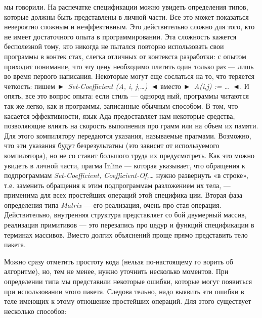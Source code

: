 \documentclass{../../template/mai_book}
\begin{document}
мы говорили. На распечатке спецификации можно увидеть определения
типов, которые должны быть представлены в личной части.
Все это может показаться невероятно сложным и неэффективным.
Это действительно сложно для того, кто не имеет достаточного опыта
в программировании. Эта сложность кажется бесполезной тому, кто
никогда не пытался повторно использовать свои программы в контек­
стах, слегка отличных от контекста разработки: с опытом приходит
понимание, что эту цену необходимо платить один только раз — лишь
во время первого написания. Некоторые могут еще сослаться на то,
что теряется четкость: пишем \textit{►~Set-Coefficient (A, i, j,\dots)~◄} вместо
\textit{►~A(i,j) := \dots~◄}. И опять, все это вопрос опыта: если стиль — однород­
ный, программы читаются так же легко, как и программы, записанные
обычным способом.
В том, что касается эффективности, язык Ада предоставляет нам
некоторые средства, позволяющие влиять на скорость выполнения про­
грамм или на объем их памяти. Для этого компилятору передаются
указания, называемые прагмами. Возможно, что эти указания будут
безрезультатны (это зависит от используемого компилятора), но не со­
ставит большого труда их предусмотреть. Как это можно увидеть в
личной части, прагма Inline — которая указывает, что обращения к
подпрограммам \textit{Set-Coefficient, Coefficient-Of,\dots} нужно развернуть «в
строке», т.е. заменить обращения к этим подпрограммам разложением
их тела, — применима для всех простейших операций этой специфика­
ции.
Вторая фаза определения типа \textit{Matrix} — его реализация, очень про­
стая операция. Действительно, внутренняя структура представляет со­
бой двумерный массив, реализация примитивов — это перезапись про­
цедур и функций спецификации в терминах массивов. Вместо долгих
объяснений проще прямо представить тело пакета.

\newpage

Можно сразу отметить простоту кода (нельзя по-настоящему го­
	ворить об алгоритме), но, тем не менее, нужно уточнить несколько
моментов. При определении типа мы представили некоторые ошибки,
которые могут появиться при использовании этого пакета. Следова­
тельно, надо выявить эти ошибки в теле имеющих к этому отношение
простейших операций. Для этого существует несколько способов:
\end{document}
